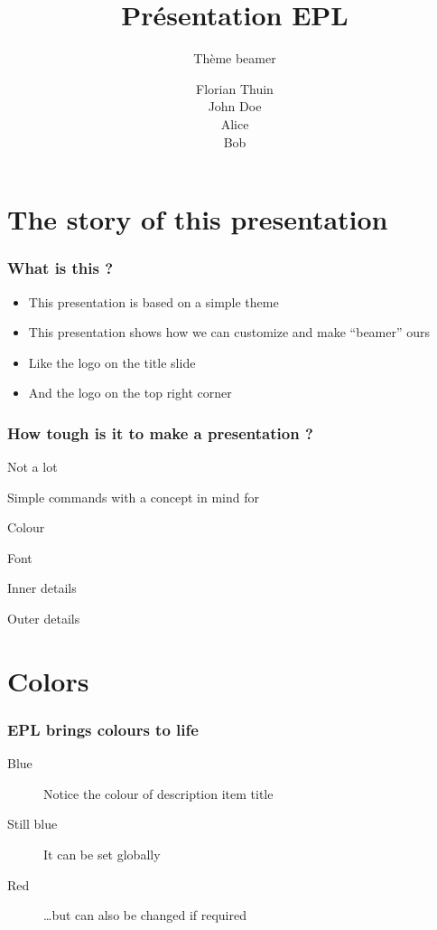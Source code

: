 \documentclass{beamer}
\title{Présentation EPL}
\subtitle{Thème beamer}
\author{Florian Thuin \\ John Doe \\ Alice \\ Bob}
\institute{Ecole Polytechnique de Louvain}
\newenvironment{wideitemize}{\itemize\addtolength{\itemsep}{10pt}}{\enditemize}
\begin{document}
\begin{frame}[plain]
	\titlepage
\end{frame}



\section{The story of this presentation}

\begin{frame}
	\frametitle{What is this ?}
		\begin{itemize}
 			\item This presentation is based on a simple theme
 			\item This presentation shows how we can customize and make
                \enquote{beamer} ours
 			\item Like the logo on the title slide
 			\item And the logo on the top right corner
 		\end{itemize}
\end{frame}


\begin{frame}
	\frametitle{How tough is it to make a presentation ?}
		\begin{wideitemize}
			\item Not a lot
			\item Simple commands with a concept in mind for
			\pause
			\item Colour
			\pause
			\item Font
			\pause
			\item Inner details
			\pause
			\item Outer details
		\end{wideitemize}
\end{frame}

\section{Colors}

\begin{frame}
	\frametitle{EPL brings colours to life}
		\begin{description}
			\item [Blue] Notice the colour of description item title
			\item [Still blue] It can be set globally
			\item [\color{red} Red] \dots but can also be changed if required
		\end{description}
\end{frame}	
\end{document}

